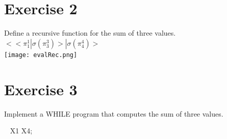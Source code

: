 \documentclass[11pt]{article}
\begin{document}
\newpage

\section{Exercise 2}

Define a recursive function for the sum of three values.
\\

$<<\pi _1^1|\sigma(\pi_3^3)>|\sigma(\pi_4^4)>$ \\
\texttt{[image: evalRec.png]}


\section{Exercise 3}
Implement a WHILE program that computes the sum of three values.

\begin{whilecode}[H]

 X1 \Assig X4;

\end{whilecode}
\end{document}
